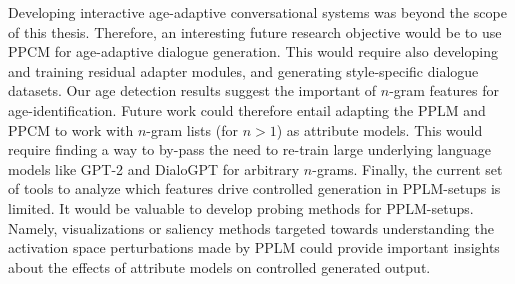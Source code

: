 Developing interactive age-adaptive conversational systems was beyond the scope of this thesis. Therefore, an interesting future research objective would be to use PPCM for age-adaptive dialogue generation. This would require also developing and training residual adapter modules, and generating style-specific dialogue datasets. Our age detection results suggest the important of $n$-gram features for age-identification. Future work could therefore entail adapting the PPLM and PPCM to work with $n$-gram lists (for $n>1$) as attribute models. This would require finding a way to by-pass the need to re-train large underlying language models like GPT-2 and DialoGPT for arbitrary $n$-grams. Finally, the current set of tools to analyze which features drive controlled generation in PPLM-setups is limited. It would be valuable to develop probing methods for PPLM-setups. Namely, visualizations or saliency methods targeted towards understanding the activation space perturbations made by PPLM could provide important insights about the effects of attribute models on controlled generated output.

